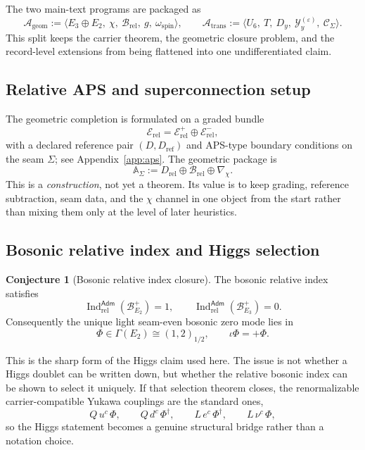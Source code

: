 \documentclass[11pt,a4paper]{article}
\theoremstyle{definition}
\newtheorem{conjecture}[theorem]{Conjecture}
\theoremstyle{remark}
\DeclareMathOperator{\Ind}{Ind}
\newcommand{\Seam}{\Sigma}
\newcommand{\inv}{\iota}
\newcommand{\Ageom}{\mathcal A_{\mathrm{geom}}}
\newcommand{\Atrans}{\mathcal A_{\mathrm{trans}}}
\begin{document}
The two main-text programs are packaged as
\[
\Ageom
:=
\langle E_3\oplus E_2,\ \chi,\ \mathcal B_{\mathrm{rel}},\ g,\ \omega_{\mathrm{spin}}\rangle,
\qquad
\Atrans
:=
\langle U_6,\ T,\ D_y,\ \mathcal Y_y^{(\varepsilon)},\ \mathcal C_{\Seam}\rangle.
\]
This split keeps the carrier theorem, the geometric closure problem, and the record-level extensions from being flattened into one undifferentiated claim.

\subsection{Relative APS and superconnection setup}

The geometric completion is formulated on a graded bundle
\[
\mathcal E_{\mathrm{rel}}=\mathcal E_{\mathrm{rel}}^+\oplus\mathcal E_{\mathrm{rel}}^-,
\]
with a declared reference pair $(D,D_{\mathrm{ref}})$ and APS-type boundary conditions on the seam $\Seam$; see Appendix~\ref{app:aps}. The geometric package is
\[
\mathbb A_{\Seam}:=D_{\mathrm{rel}}\oplus\mathcal B_{\mathrm{rel}}\oplus\nabla_\chi.
\]
This is a \emph{construction}, not yet a theorem. Its value is to keep grading, reference subtraction, seam data, and the $\chi$ channel in one object from the start rather than mixing them only at the level of later heuristics.

\subsection{Bosonic relative index and Higgs selection}

\begin{conjecture}[Bosonic relative index closure]
The bosonic relative index satisfies
\[
\Ind_{\mathrm{rel}}^{\mathsf{Adm}}(\mathcal B_{E_2}^+)=1,
\qquad
\Ind_{\mathrm{rel}}^{\mathsf{Adm}}(\mathcal B_{E_3}^+)=0.
\]
Consequently the unique light seam-even bosonic zero mode lies in
\[
\Phi\in\Gamma(E_2)\cong (1,2)_{1/2},
\qquad
\inv\Phi=+\Phi.
\]
\end{conjecture}

This is the sharp form of the Higgs claim used here. The issue is not whether a Higgs doublet can be written down, but whether the relative bosonic index can be shown to select it uniquely.
If that selection theorem closes, the renormalizable carrier-compatible Yukawa couplings are the standard ones,
\[
Q\,u^c\,\Phi,
\qquad
Q\,d^c\,\Phi^\dagger,
\qquad
L\,e^c\,\Phi^\dagger,
\qquad
L\,\nu^c\,\Phi,
\]
so the Higgs statement becomes a genuine structural bridge rather than a notation choice.
\end{document}
